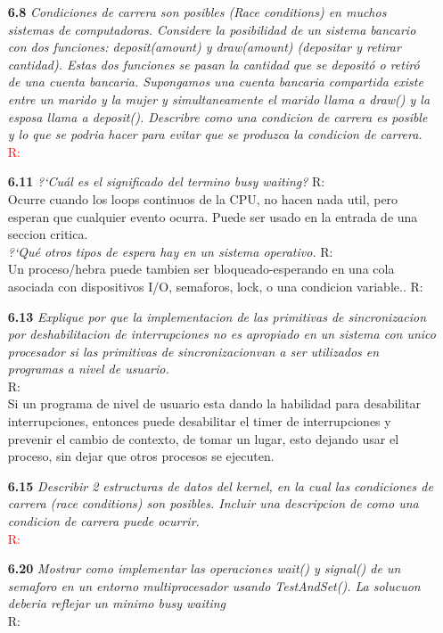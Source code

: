\begin{itemize}
\item[\textbf{6.8}]\emph{Condiciones de carrera son posibles (Race conditions) en muchos sistemas de computadoras. Considere la posibilidad de un sistema bancario con dos funciones: deposit(amount) y draw(amount) (depositar y retirar cantidad). Estas dos funciones se pasan la cantidad que se deposit\'o o retir\'o de una cuenta bancaria. Supongamos una cuenta bancaria compartida existe entre un marido y la mujer y simultaneamente el marido llama a draw() y la esposa llama a deposit(). Describre como una condicion de carrera es posible y lo que se podria hacer para evitar que se produzca la condicion de carrera.}\\
\textcolor{red}{R:}

\item[\textbf{6.11}]\emph {?`Cu\'al es el significado del termino busy waiting?}
R:\\
Ocurre cuando los loops continuos de la CPU, no hacen nada util, pero esperan que cualquier evento ocurra. Puede ser usado en la entrada de una seccion critica.\\
\emph{?`Qu\'e otros tipos de espera hay en un sistema operativo.}
R:\\
Un proceso/hebra puede tambien ser bloqueado-esperando en una cola asociada con dispositivos I/O, semaforos, lock, o una condicion variable..
R:\\
\item[\textbf{6.13}]\emph {Explique por que la implementacion de las primitivas de sincronizacion por deshabilitacion de interrupciones no es apropiado en un sistema con unico procesador si las primitivas de sincronizacionvan a ser utilizados en programas a nivel de usuario.}\\
R:\\
Si un programa de nivel de usuario esta dando la habilidad para desabilitar interrupciones,  entonces puede desabilitar el timer de interrupciones y prevenir el cambio de contexto, de tomar un lugar, esto dejando usar el proceso, sin dejar que otros procesos se ejecuten.\\
\item[\textbf{6.15}]\emph {Describir 2 estructuras de datos del kernel, en la cual las condiciones de carrera (race conditions) son posibles. Incluir una descripcion de como una condicion de carrera puede ocurrir.}\\
\textcolor{red}{R:}

\item[\textbf{6.20}]\emph {Mostrar como implementar las operaciones wait() y signal() de un semaforo en un entorno multiprocesador usando TestAndSet(). La solucuon deberia reflejar un minimo busy waiting}\\
R:\\


\end{itemize}
